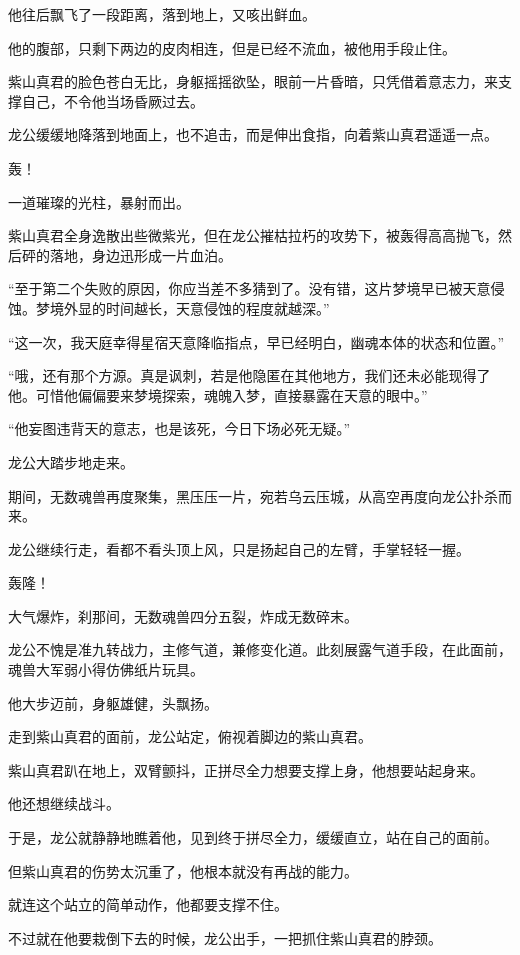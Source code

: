 \begin{this_body}
他往后飘飞了一段距离，落到地上，又咳出鲜血。

他的腹部，只剩下两边的皮肉相连，但是已经不流血，被他用手段止住。

紫山真君的脸色苍白无比，身躯摇摇欲坠，眼前一片昏暗，只凭借着意志力，来支撑自己，不令他当场昏厥过去。

龙公缓缓地降落到地面上，也不追击，而是伸出食指，向着紫山真君遥遥一点。

轰！

一道璀璨的光柱，暴射而出。

紫山真君全身逸散出些微紫光，但在龙公摧枯拉朽的攻势下，被轰得高高抛飞，然后砰的落地，身边迅形成一片血泊。

“至于第二个失败的原因，你应当差不多猜到了。没有错，这片梦境早已被天意侵蚀。梦境外显的时间越长，天意侵蚀的程度就越深。”

“这一次，我天庭幸得星宿天意降临指点，早已经明白，幽魂本体的状态和位置。”

“哦，还有那个方源。真是讽刺，若是他隐匿在其他地方，我们还未必能现得了他。可惜他偏偏要来梦境探索，魂魄入梦，直接暴露在天意的眼中。”

“他妄图违背天的意志，也是该死，今日下场必死无疑。”

龙公大踏步地走来。

期间，无数魂兽再度聚集，黑压压一片，宛若乌云压城，从高空再度向龙公扑杀而来。

龙公继续行走，看都不看头顶上风，只是扬起自己的左臂，手掌轻轻一握。

轰隆！

大气爆炸，刹那间，无数魂兽四分五裂，炸成无数碎末。

龙公不愧是准九转战力，主修气道，兼修变化道。此刻展露气道手段，在此面前，魂兽大军弱小得仿佛纸片玩具。

他大步迈前，身躯雄健，头飘扬。

走到紫山真君的面前，龙公站定，俯视着脚边的紫山真君。

紫山真君趴在地上，双臂颤抖，正拼尽全力想要支撑上身，他想要站起身来。

他还想继续战斗。

于是，龙公就静静地瞧着他，见到终于拼尽全力，缓缓直立，站在自己的面前。

但紫山真君的伤势太沉重了，他根本就没有再战的能力。

就连这个站立的简单动作，他都要支撑不住。

不过就在他要栽倒下去的时候，龙公出手，一把抓住紫山真君的脖颈。


\end{this_body}

